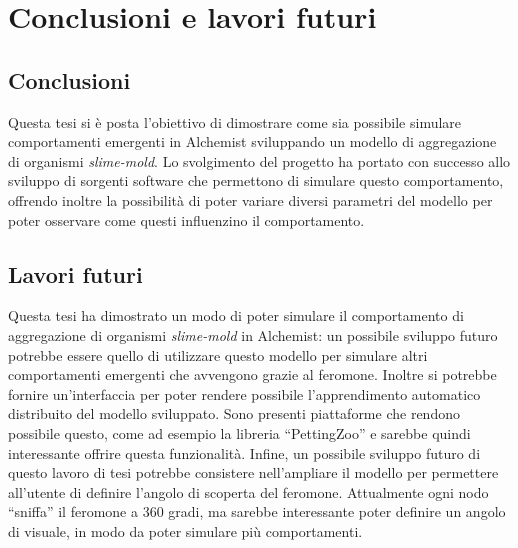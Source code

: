 \chapter{Conclusioni e lavori futuri}
\section{Conclusioni}
Questa tesi si è posta l'obiettivo di dimostrare come sia possibile simulare comportamenti emergenti in Alchemist sviluppando un modello
di aggregazione di organismi \textit{slime-mold}. 
Lo svolgimento del progetto ha portato con successo allo sviluppo di sorgenti software che permettono di simulare
questo comportamento, offrendo inoltre la possibilità di poter variare diversi parametri del modello per poter osservare
come questi influenzino il comportamento. 


\section{Lavori futuri}
Questa tesi ha dimostrato un modo di poter simulare il comportamento di aggregazione di organismi \textit{slime-mold} in Alchemist:
un possibile sviluppo futuro potrebbe essere quello di utilizzare questo modello per simulare altri comportamenti emergenti che avvengono 
grazie al feromone.\newline
Inoltre si potrebbe fornire un'interfaccia per poter 
rendere possibile l'apprendimento automatico distribuito del modello sviluppato.
Sono presenti piattaforme che rendono possibile questo, come ad esempio la libreria ``PettingZoo''\cite{terry2021pettingzoo} e sarebbe quindi interessante offrire questa funzionalità.
Infine, un possibile sviluppo futuro di questo lavoro di tesi potrebbe consistere nell'ampliare il modello per permettere all'utente di definire l'angolo di 
scoperta del feromone. Attualmente ogni nodo ``sniffa'' il feromone a 360 gradi, ma sarebbe interessante
poter definire un angolo di visuale, in modo da poter simulare più comportamenti.